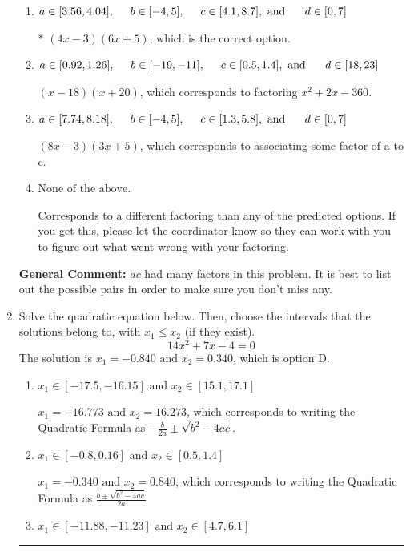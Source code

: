 \documentclass{extbook}[14pt]
\newcommand{\litem}[1]{\item #1

\rule{\textwidth}{0.4pt}}
\begin{document}
\begin{enumerate}
{\begin{enumerate}[label=\Alph*.]
 $(2x -3)(12x + 5)$, which corresponds to associating some factor of c to a.
\item \( a \in [3.56, 4.04], \hspace*{5mm} b \in [-4, 5], \hspace*{5mm} c \in [4.1, 8.7], \text{ and } \hspace*{5mm} d \in [0, 7] \)

* $(4x -3)(6x + 5)$, which is the correct option.
\item \( a \in [0.92, 1.26], \hspace*{5mm} b \in [-19, -11], \hspace*{5mm} c \in [0.5, 1.4], \text{ and } \hspace*{5mm} d \in [18, 23] \)

 $(x -18)(x + 20)$, which corresponds to factoring $x^{2} +2 x -360$.
\item \( a \in [7.74, 8.18], \hspace*{5mm} b \in [-4, 5], \hspace*{5mm} c \in [1.3, 5.8], \text{ and } \hspace*{5mm} d \in [0, 7] \)

 $(8x -3)(3x + 5)$, which corresponds to associating some factor of a to c.
\item \( \text{None of the above.} \)

 Corresponds to a different factoring than any of the predicted options. If you get this, please let the coordinator know so they can work with you to figure out what went wrong with your factoring.
\end{enumerate}

\textbf{General Comment:} $ac$ had many factors in this problem. It is best to list out the possible pairs in order to make sure you don't miss any.
}
\litem{
Solve the quadratic equation below. Then, choose the intervals that the solutions belong to, with $x_1 \leq x_2$ (if they exist).
\[ 14x^{2} +7 x -4 = 0 \]The solution is \( x_1 = -0.840 \text{ and } x_2 = 0.340 \), which is option D.\begin{enumerate}[label=\Alph*.]
\item \( x_1 \in [-17.5, -16.15] \text{ and } x_2 \in [15.1, 17.1] \)

 $x_1 = -16.773 \text{ and } x_2 = 16.273$, which corresponds to writing the Quadratic Formula as $-\frac{b}{2a} \pm \sqrt{b^2 - 4ac}$.
\item \( x_1 \in [-0.8, 0.16] \text{ and } x_2 \in [0.5, 1.4] \)

 $x_1 = -0.340 \text{ and } x_2 = 0.840$, which corresponds to writing the Quadratic Formula as $\frac{b \pm \sqrt{b^2 - 4ac}}{2a}$
\item \( x_1 \in [-11.88, -11.23] \text{ and } x_2 \in [4.7, 6.1] \)


\end{enumerate}}
\end{enumerate}
\end{document}
